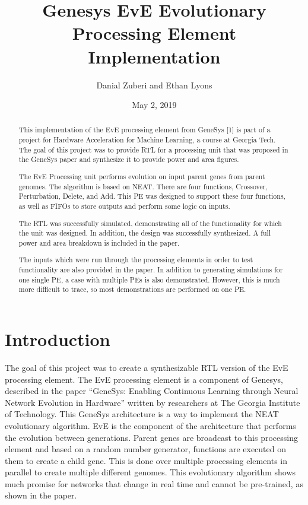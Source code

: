 \documentclass[preprint,pre,floats,aps,amsmath,amssymb]{revtex4}
\begin{document}
\title{Genesys EvE Evolutionary Processing Element Implementation}
\author{Danial Zuberi and Ethan Lyons}
\date{May 2, 2019}

\begin{abstract}

This implementation of the EvE processing element from GeneSys [1] is part of a project for Hardware Acceleration for Machine Learning, a course at Georgia Tech. The goal of this project was to provide RTL for a processing unit that was proposed in the GeneSys paper and synthesize it to provide power and area figures.

The EvE Processing unit performs evolution on input parent genes from parent genomes. The algorithm is based on NEAT. There are four functions, Crossover, Perturbation, Delete, and Add. This PE was designed to support these four functions, as well as FIFOs to store outputs and perform some logic on inputs.

The RTL was successfully simulated, demonstrating all of the functionality for which the unit was designed. In addition, the design was successfully synthesized. A full power and area breakdown is included in the paper.

The inputs which were run through the processing elements in order to test functionality are also provided in the paper. In addition to generating simulations for one single PE, a case with multiple PEs is also demonstrated. However, this is much more difficult to trace, so most demonstrations are performed on one PE.

\end{abstract}

\maketitle

\section{Introduction}

The goal of this project was to create a synthesizable RTL version of the EvE processing element. The EvE processing element is a component of Genesys, described in the paper “GeneSys: Enabling Continuous Learning through Neural Network Evolution in Hardware” written by researchers at The Georgia Institute of Technology. This GeneSys architecture is a way to implement the NEAT evolutionary algorithm. EvE is the component of the architecture that performs the evolution between generations. Parent genes are broadcast to this processing element and based on a random number generator, functions are executed on them to create a child gene. This is done over multiple processing elements in parallel to create multiple different genomes. This evolutionary algorithm shows much promise for networks that change in real time and cannot be pre-trained, as shown in the paper.
\end{document}
